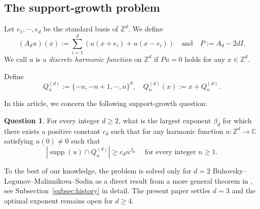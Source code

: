 \documentclass[11pt,reqno]{amsart}
\newcommand\Z{\ensuremath{\mathbb{Z}}}
\newcommand\C{\ensuremath{\mathbb{C}}}
\newcommand{\supp}{\operatorname{supp}}
\theoremstyle{definition}
\newtheorem*{question}{Question}
\theoremstyle{plain}
\numberwithin{equation}{section}
\begin{document}
\subsection{The support-growth problem}



Let $e_1,\cdots,e_d$ be the standard basis of $\Z^d$. We define
\begin{equation*}
    (A_du)(x):=\sum_{i=1}^d\left(u(x+e_i)+u(x-e_i)\right) \quad\text{and}\quad P:=A_d-2dI. 
\end{equation*}
We call $u$ is a \emph{discrete harmonic function} on $\Z^d$ if $Pu=0$ holds for any $x\in \Z^d$. 

Define
\begin{equation*}
    Q_n^{(d)}:=\lbrace -n,-n+1,\cdots,n\rbrace^d,\quad Q_n^{(d)}(x):=x+Q_n^{(d)}.
\end{equation*}






In this article, we concern the following support-growth question:
\begin{question}
    For every integer $d\ge 2$, what is the largest exponent $\beta_d$ for which there exists a positive constant $c_d$ such that for any harmonic function $u:\Z^d\to \C$ satisfying $u(0)\neq 0$ such that
    \begin{equation*}
        |\supp(u)\cap Q_n^{(d)}|\ge c_d n^{\beta_d} \quad \text{ for every integer } n\ge 1.
    \end{equation*}
\end{question}
To the best of our knowledge, the problem is solved only for $d=2$  Buhovsky--Logunov--Malinnikova--Sodin  as a direct result from a more general theorem in \cite{BLMS}, see Subsection~\ref{subsec:history} in detail. The present paper settles $d=3$ and the optimal exponent remains open for $d\ge 4$.
\end{document}
